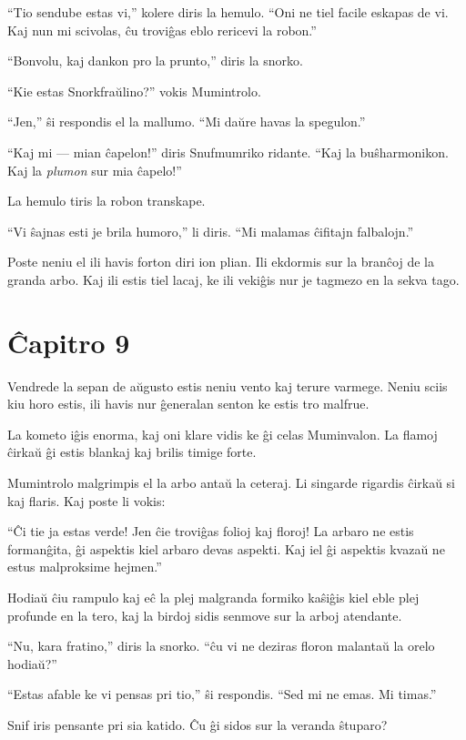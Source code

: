 ``Tio sendube estas vi,'' kolere diris la hemulo. ``Oni ne tiel facile eskapas de vi. Kaj nun mi scivolas, ĉu troviĝas eblo rericevi la robon.''

``Bonvolu, kaj dankon pro la prunto,'' diris la snorko.

``Kie estas Snorkfraŭlino?'' vokis Mumintrolo.

``Jen,'' ŝi respondis el la mallumo. ``Mi daŭre havas la spegulon.''

``Kaj mi --- mian ĉapelon!'' diris Snufmumriko ridante. ``Kaj la buŝharmonikon. Kaj la \emph{plumon} sur mia ĉapelo!''

La hemulo tiris la robon transkape.

``Vi ŝajnas esti je brila humoro,'' li diris. ``Mi malamas ĉifitajn falbalojn.''

Poste neniu el ili havis forton diri ion plian. Ili ekdormis sur la branĉoj de la granda arbo. Kaj ili estis tiel lacaj, ke ili vekiĝis nur je tagmezo en la sekva tago.

\chapter*[Ĉapitro 9]{Ĉapitro 9}


Vendrede la sepan de aŭgusto estis neniu vento kaj terure varmege. Neniu sciis kiu horo estis, ili havis nur ĝeneralan senton ke estis tro malfrue.

La kometo iĝis enorma, kaj oni klare vidis ke ĝi celas Muminvalon. La flamoj ĉirkaŭ ĝi estis blankaj kaj brilis timige forte.

Mumintrolo malgrimpis el la arbo antaŭ la ceteraj. Li singarde rigardis ĉirkaŭ si kaj flaris. Kaj poste li vokis:

``Ĉi tie ja estas verde! Jen ĉie troviĝas folioj kaj floroj! La arbaro ne estis formanĝita, ĝi aspektis kiel arbaro devas aspekti. Kaj iel ĝi aspektis kvazaŭ ne estus malproksime hejmen.''

Hodiaŭ ĉiu rampulo kaj eĉ la plej malgranda formiko kaŝiĝis kiel eble plej profunde en la tero, kaj la birdoj sidis senmove sur la arboj atendante.

``Nu, kara fratino,'' diris la snorko. ``ĉu vi ne deziras floron malantaŭ la orelo hodiaŭ?''

``Estas afable ke vi pensas pri tio,'' ŝi respondis. ``Sed mi ne emas. Mi timas.''

Snif iris pensante pri sia katido. Ĉu ĝi sidos sur la veranda ŝtuparo?

